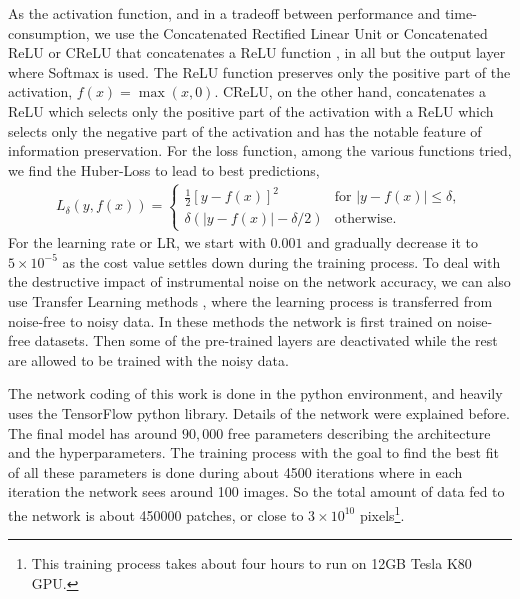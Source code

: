 \documentclass[fleqn,usenatbib]{mnras}
\begin{document}
As the activation function, and in a tradeoff between performance and time-consumption, we use  the Concatenated Rectified Linear Unit or Concatenated  ReLU or CReLU that concatenates a ReLU function \citep{shang2016understanding}, in all but the output layer where Softmax is  used.
 The  ReLU function preserves only the positive part of the activation, $f(x)=\max(x,0)$. 
 CReLU, on the other hand,  concatenates a ReLU which selects only the positive part of the activation with a ReLU which selects only the negative part of the activation and has the notable feature of information preservation.
%
For the loss function, among the various  functions tried, we find the Huber-Loss to lead to best predictions,  
\begin{align}
L_{\delta}(y,f(x)) = \left\{ \begin{array}{cl}
\frac{1}{2} \left[y-f(x)\right]^2 & \text{for }|y-f(x)| \le \delta, \\
\delta \left(|y-f(x)|-\delta/2\right) & \text{otherwise.}
\end{array}\right.
\label{huber_loss}
\end{align}
For the learning rate or LR, we start with $0.001$ and gradually decrease it to $5\times 10^{-5}$ as the cost value settles down during the training process.
To deal with the destructive impact of 
 instrumental noise on the network accuracy, we 
can also use Transfer Learning methods \citep{pan2009survey}, where the learning process is transferred from noise-free  to noisy data. 
In these methods the network is first trained on noise-free datasets. 
Then some of the pre-trained layers are deactivated while the rest are allowed to be trained with the noisy data. 
%

The network coding of this work is done in the python environment, and heavily uses the TensorFlow \citep{abadi2016tensorflow} python library.%
Details of the network were explained before. The final model has around $90,000$ free parameters describing the architecture and  the hyperparameters. 
The training process with the goal to find the best fit of all these parameters is done during about 4500 iterations where in each iteration the network sees around 100 images. So the total amount of data fed to the network is about 450000 patches, or close to $3\times10^{10}$ pixels\footnote{This training process takes about four hours to run on 12GB  Tesla K80 GPU.}.
\end{document}
